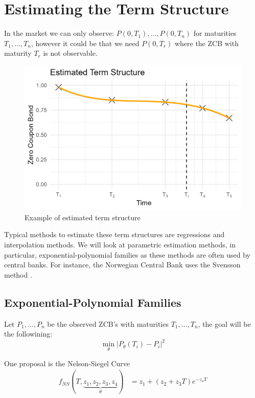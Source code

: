 \newpage 
\section{Estimating the Term Structure}
In the market we can only observe: $P(0,T_{1}), \dots, P(0, T_{n})$ for maturities $T_{1}, \dots, T_{n}$, however it could be that we need $P(0,T_{r})$ where the ZCB with maturity $T_{r}$ is not observable. 

\begin{figure}[htp]
    \centering
    \includegraphics[width=12cm]{figures/Estimating_term_structure.png}
    \caption{Example of estimated term structure}
    \label{fig: Estimaing_term_structure}
\end{figure}


Typical methods to estimate these term structures are regressions and interpolation methods. We will look at parametric estimation methods, in particular, exponential-polynomial families as these methods are often used by central banks. For instance, the Norwegian Central Bank uses the Svensson method \cite{NB_ZCB}.

\subsection{Exponential-Polynomial Families}
Let $P_{1}, \dots, P_{n}$ be the observed ZCB's with maturities $T_{1}, \dots, T_{n}$, the goal will be the followining: 
\[
\min\limits_{\theta}|P_{\theta}(T_{i}) - P_{i}|^{2}
\]

One proposal is the Nelson-Siegel Curve
\begin{align*}
f_{NS}(T, \underbrace{z_{1}, z_{2}, z_{3}, z_{4}}_{\theta}) 
&= 
z_{1} + (z_{2} + z_{3}T)e^{-z_{4}T}
\end{align*}


